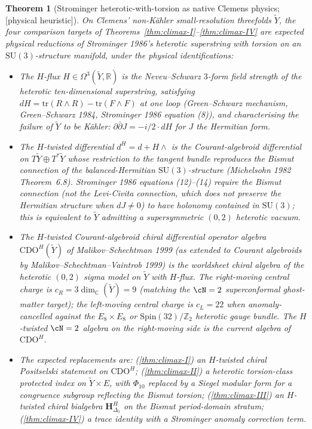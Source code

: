 \documentclass[11pt,reqno]{amsart}
\theoremstyle{plain}
\newtheorem{theorem}{Theorem}[section]
\theoremstyle{definition}
\theoremstyle{remark}
\providecommand{\ClaimStatusHeuristic}{\textnormal{[physical heuristic]}}
\newcommand{\Cbb}{\mathbb{C}}
\newcommand{\Rbb}{\mathbb{R}}
\newcommand{\Zbb}{\mathbb{Z}}
\newcommand{\bfH}{\mathbf{H}}
\begin{document}
\begin{theorem}[Strominger heterotic-with-torsion as native Clemens physics; \ClaimStatusHeuristic]
\label{thm:strominger-native}
On Clemens' non-K\"ahler small-resolution threefolds $\tilde Y$, the four comparison targets of Theorems~\ref{thm:climax-I}--\ref{thm:climax-IV} are expected physical reductions of Strominger 1986's heterotic superstring with torsion on an $\mathrm{SU}(3)$-structure manifold, under the physical identifications:
\begin{itemize}
  \item The $H$-flux $H \in \Omega^3(\tilde Y, \Rbb)$ is the Neveu--Schwarz $3$-form field strength of the heterotic ten-dimensional superstring, satisfying $dH = \mathrm{tr}(R \wedge R) - \mathrm{tr}(F \wedge F)$ at one loop (Green--Schwarz mechanism, Green--Schwarz 1984, Strominger 1986 equation (8)), and characterising the failure of $\tilde Y$ to be K\"ahler: $\partial \bar\partial J = - i/2 \cdot dH$ for $J$ the Hermitian form.
  \item The $H$-twisted differential $d^H = d + H \wedge$ is the Courant-algebroid differential on $T\tilde Y \oplus T^*\tilde Y$ whose restriction to the tangent bundle reproduces the Bismut connection of the balanced-Hermitian $\mathrm{SU}(3)$-structure (Michelsohn 1982 Theorem~6.8). Strominger 1986 equations (12)--(14) require the Bismut connection (not the Levi-Civita connection, which does not preserve the Hermitian structure when $dJ \neq 0$) to have holonomy contained in $\mathrm{SU}(3)$; this is equivalent to $\tilde Y$ admitting a supersymmetric $(0, 2)$ heterotic vacuum.
  \item The $H$-twisted Courant-algebroid chiral differential operator algebra $\mathrm{CDO}^H(\tilde Y)$ of Malikov--Schechtman 1999 (as extended to Courant algebroids by Malikov--Schechtman--Vaintrob 1999) is the worldsheet chiral algebra of the heterotic $(0, 2)$ sigma model on $\tilde Y$ with $H$-flux. The right-moving central charge is $c_R = 3 \dim_\Cbb(\tilde Y) = 9$ (matching the $\cN = 2$ superconformal ghost-matter target); the left-moving central charge is $c_L = 22$ when anomaly-cancelled against the $E_8 \times E_8$ or $\mathrm{Spin}(32)/\Zbb_2$ heterotic gauge bundle. The $H$-twisted $\cN = 2$ algebra on the right-moving side is the current algebra of $\mathrm{CDO}^H$.
  \item The expected replacements are: (\ref{thm:climax-I}) an $H$-twisted chiral Positselski statement on $\mathrm{CDO}^H$; (\ref{thm:climax-II}) a heterotic torsion-class protected index on $\tilde Y \times E$, with $\Phi_{10}$ replaced by a Siegel modular form for a congruence subgroup reflecting the Bismut torsion; (\ref{thm:climax-III}) an $H$-twisted chiral bialgebra $\bfH^H_{\Delta_5}$ on the Bismut period-domain stratum; (\ref{thm:climax-IV}) a trace identity with a Strominger anomaly correction term.
\end{itemize}
\end{theorem}
\end{document}
